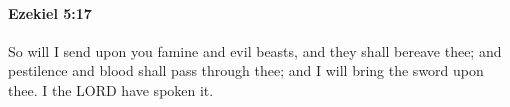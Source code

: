 
		\paragraph{Ezekiel 5:17} %
			\label{EZEKIEL-5-17}

			So will I send upon you famine and evil beasts, and they shall bereave thee; and pestilence and blood shall pass through thee; and I will bring the sword upon thee. I the LORD have spoken it.

